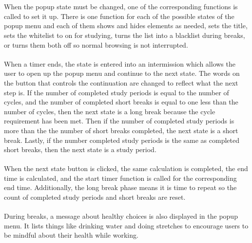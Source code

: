 \documentclass[12pt]{article}
\begin{document}
\\\\
When the popup state must be changed, one of the corresponding functions is called to set it up. There is one function for each of the possible states of the popup 
menu and each of them shows and hides elements as needed, sets the title, sets the whitelist to on for studying, turns the list into a blacklist during breaks, or turns 
them both off so normal browsing is not interrupted.
\\\\
\indent When a timer ends, the state is entered into an intermission which allows the user to open up the popup menu and continue to the next state. The words on the button that controls the continuation 
are changed to reflect what the next step is. If the number of completed study periods is equal to the number of cycles, and the number of completed short breaks 
is equal to one less than the number of cycles, then the next state is a long break because the cycle requirement has been met. 
Then if the number of completed study periods is more than the the number of short breaks completed, the next state is a short break. 
Lastly, if the number completed study periods is the same as completed short breaks, then the next state is a study period.
\\\\\indent When the next state button is clicked, the same calculation is completed, the end time is calculated, and the start timer function is called for the corresponding end time. 
Additionally, the long break phase means it is time to repeat so the count of completed study periods and short breaks are reset.
\\\\\indent During breaks, a message about healthy choices is also displayed in the popup menu. It lists things like drinking water and doing stretches to encourage users to be mindful about their health while working. \\
\end{document}

